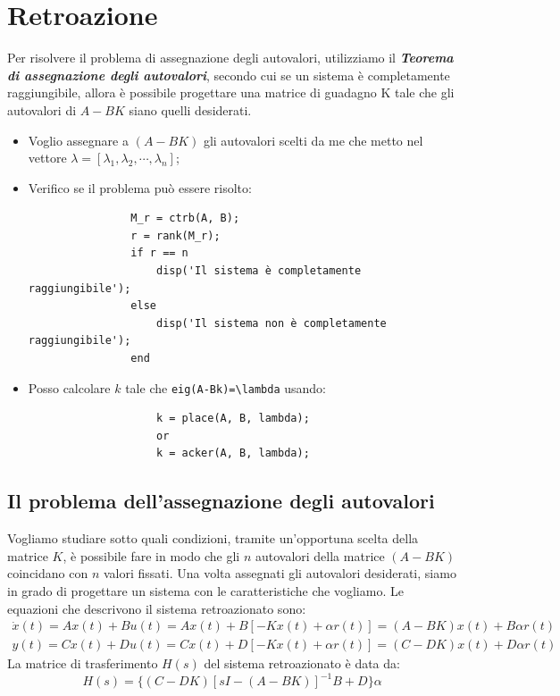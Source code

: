 \section{Retroazione}
Per risolvere il problema di assegnazione degli autovalori, utilizziamo il
\textit{\textbf{Teorema di assegnazione degli autovalori}}, secondo cui se un
sistema è completamente raggiungibile, allora è possibile progettare una
matrice di guadagno K tale che gli autovalori di $A - B K$ siano quelli
desiderati.
\begin{tcolorbox}
    \begin{itemize}
        \item Voglio assegnare a $(A - B K)$ gli autovalori scelti da me che metto nel
              vettore $\lambda=[\lambda_1, \lambda_2, \cdots, \lambda_n]$;
        \item Verifico se il problema può essere risolto:
              \begin{verbatim}
                M_r = ctrb(A, B);
                r = rank(M_r);
                if r == n
                    disp('Il sistema è completamente raggiungibile');
                else
                    disp('Il sistema non è completamente raggiungibile');
                end
            \end{verbatim}
        \item Posso calcolare $k$ tale che \verb|eig(A-Bk)=\lambda| usando:
              \begin{verbatim}
                    k = place(A, B, lambda);
                    or 
                    k = acker(A, B, lambda);
            \end{verbatim}

    \end{itemize}
\end{tcolorbox}
\subsection{Il problema dell'assegnazione degli autovalori}
Vogliamo studiare sotto quali condizioni, tramite un'opportuna scelta della
matrice $K$, è possibile fare in modo che gli $n$ autovalori della matrice $(A
    - B K)$ coincidano con $n$ valori fissati. Una volta assegnati gli autovalori
desiderati, siamo in grado di progettare un sistema con le caratteristiche che
vogliamo. Le equazioni che descrivono il sistema retroazionato sono:
\begin{align*}
    \dot{x}(t) = Ax(t) + Bu(t) = A x(t) + B [-K x(t) + \alpha r(t)] = (A - B K) x(t) + B \alpha r(t) \\
    y(t) = C x(t) + D u(t) = C x(t) + D [-K x(t) + \alpha r(t)] = (C - D K) x(t) + D \alpha r(t)
\end{align*}
La matrice di trasferimento $H(s)$ del sistema retroazionato è data da:
\begin{equation}
    H(s) = \{ (C - D K) [sI - (A - B K)]^{-1} B + D \}\alpha
\end{equation}

